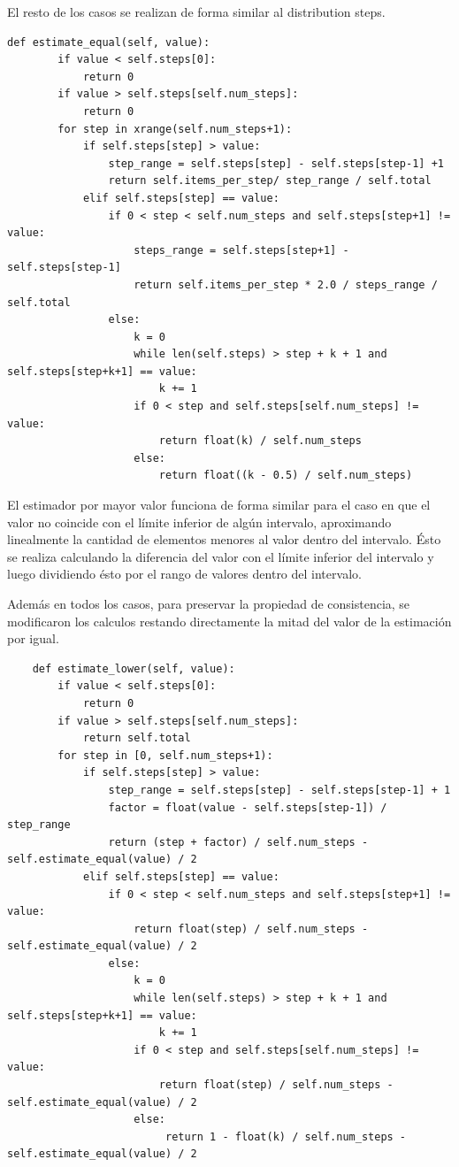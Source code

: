 \documentclass[a4paper, 10pt, twoside]{article}
\begin{document}
El resto de los casos se realizan de forma similar al distribution steps.

\begin{verbatim}
def estimate_equal(self, value):
        if value < self.steps[0]:
            return 0
        if value > self.steps[self.num_steps]:
            return 0
        for step in xrange(self.num_steps+1):
            if self.steps[step] > value:
                step_range = self.steps[step] - self.steps[step-1] +1
                return self.items_per_step/ step_range / self.total
            elif self.steps[step] == value:
                if 0 < step < self.num_steps and self.steps[step+1] != value:
                    steps_range = self.steps[step+1] - self.steps[step-1]
                    return self.items_per_step * 2.0 / steps_range / self.total
                else:
                    k = 0
                    while len(self.steps) > step + k + 1 and self.steps[step+k+1] == value:
                        k += 1
                    if 0 < step and self.steps[self.num_steps] != value:
                        return float(k) / self.num_steps
                    else:
                        return float((k - 0.5) / self.num_steps)

\end{verbatim}

El estimador por mayor valor funciona de forma similar para el caso en que el valor no coincide con el límite inferior de algún intervalo, aproximando linealmente la cantidad de elementos menores al valor dentro del intervalo. Ésto se realiza calculando la diferencia del valor con el límite inferior del intervalo y luego dividiendo ésto por el rango de valores dentro del intervalo.

Además en todos los casos, para preservar la propiedad de consistencia, se modificaron los calculos restando directamente la mitad del valor de la estimación por igual.

\begin{verbatim}
    def estimate_lower(self, value):
        if value < self.steps[0]:
            return 0
        if value > self.steps[self.num_steps]:
            return self.total
        for step in [0, self.num_steps+1):
            if self.steps[step] > value:
                step_range = self.steps[step] - self.steps[step-1] + 1
                factor = float(value - self.steps[step-1]) / step_range
                return (step + factor) / self.num_steps - self.estimate_equal(value) / 2
            elif self.steps[step] == value:
                if 0 < step < self.num_steps and self.steps[step+1] != value:
                    return float(step) / self.num_steps - self.estimate_equal(value) / 2
                else:
                    k = 0
                    while len(self.steps) > step + k + 1 and self.steps[step+k+1] == value:
                        k += 1
                    if 0 < step and self.steps[self.num_steps] != value:
                        return float(step) / self.num_steps - self.estimate_equal(value) / 2
                    else:
                         return 1 - float(k) / self.num_steps - self.estimate_equal(value) / 2                       
\end{verbatim}
\end{document}
